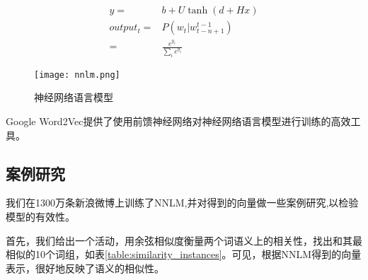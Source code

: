 \begin{align*}
y = & b+U\tanh(d+Hx)\\
output_t = & P(w_t|w_{t-n+1}^{t-1}) \\
		= & \frac{e^{y_i}}{\sum\nolimits_i {{e^{{y_i}}}} }
\end{align*}

\begin{figure}[htbp]
\centering
\texttt{[image: nnlm.png]}
\caption{神经网络语言模型}
\label{fig:nnlm}
\end{figure}

Google Word2Vec提供了使用前馈神经网络对神经网络语言模型进行训练的高效工具。

\subsection{案例研究}
我们在1300万条新浪微博上训练了NNLM,并对得到的向量做一些案例研究,以检验模型的有效性。

首先，我们给出一个活动，用余弦相似度衡量两个词语义上的相关性，找出和其最相似的10个词组，如表\ref{table:similarity_instances}。可见，根据NNLM得到的向量表示，很好地反映了语义的相似性。

